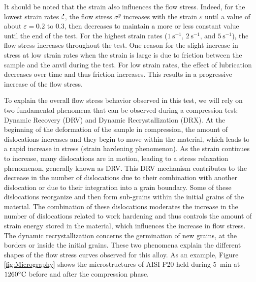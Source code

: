 \documentclass[twoside,english,1p,final,sort&compress]{elsarticle}
\theoremstyle{plain}
\DeclareRobustCommand{\mdot}[1]{\accentset{\mbox{\bfseries .}}{#1}}
\DeclareRobustCommand{\ps}{\text{s}^{-1}}
\begin{document}
It should be noted that the strain also influences the flow stress.
Indeed, for the lowest strain rates $\mdot\varepsilon$, the flow stress $\sigma^y$ increases with the strain $\varepsilon$ until a value of about $\varepsilon=0.2$ to $0.3$, then decreases to maintain a more or less constant value until the end of the test.
For the highest strain rates ($1~\ps$, $2~\ps$, and $5~\ps$), the flow stress increases throughout the test.
One reason for the slight increase in stress at low strain rates when the strain is large is due to friction between the sample and the anvil during the test.
For low strain rates, the effect of lubrication decreases over time and thus friction increases.
This results in a progressive increase of the flow stress.

To explain the overall flow stress behavior observed in this test, we will rely on two fundamental phenomena that can be observed during a compression test: Dynamic Recovery (DRV) and Dynamic Recrystallization (DRX).
At the beginning of the deformation of the sample in compression, the amount of dislocations increases and they begin to move within the material, which leads to a rapid increase in stress (strain hardening phenomenon).
As the strain continues to increase, many dislocations are in motion, leading to a stress relaxation phenomenon, generally known as DRV.
This DRV mechanism contributes to the decrease in the number of dislocations due to their combination with another dislocation or due to their integration into a grain boundary.
Some of these dislocations reorganize and then form sub-grains within the initial grains of the material.
The combination of these dislocations moderates the increase in the number of dislocations related to work hardening and thus controls the amount of strain energy stored in the material, which influences the increase in flow stress.
The dynamic recrystallization concerns the germination of new grains, at the borders or inside the initial grains.
These two phenomena explain the different shapes of the flow stress curves observed for this alloy.
As an example, Figure \ref{fig:Micrography} shows the microstructures of AISI P20 held during $5$~min at $1260\celsius$ before and after the compression phase.
\end{document}

